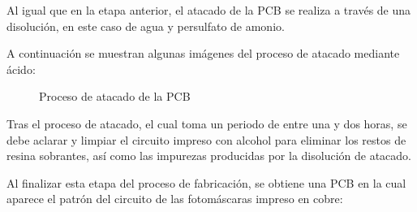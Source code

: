 \begin{itemize}
   Al igual que en la etapa anterior, el atacado de la PCB se realiza a través de una disolución, en este caso de agua y persulfato de amonio.
   
   A continuación se muestran algunas imágenes del proceso de atacado mediante ácido:
   
   \begin{figure}[H]
    \centering
    \caption{Proceso de atacado de la PCB}
    \label{fig:lego}
    \end{figure}
    
    Tras el proceso de atacado, el cual toma un periodo de entre una y dos horas, se debe aclarar y limpiar el circuito impreso con alcohol para eliminar los restos de resina sobrantes, así como las impurezas producidas por la disolución de atacado.
    
    Al finalizar esta etapa del proceso de fabricación, se obtiene una PCB en la cual aparece el patrón del circuito de las fotomáscaras impreso en cobre:
    

\end{itemize}

